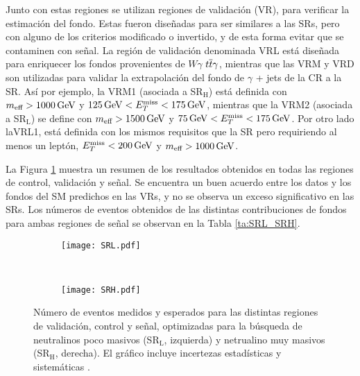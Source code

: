 Junto con estas regiones se utilizan regiones de validación (VR), para verificar la estimación del fondo. Estas fueron diseñadas para ser similares a las SRs, pero con alguno de los criterios modificado o invertido, y de esta forma evitar que se contaminen con señal. La región de validación denominada VRL está diseñada para enriquecer los fondos provenientes de $W\gamma$ $t \overline{t}\gamma$, mientras que las VRM y VRD son utilizadas para validar la extrapolación del fondo de $\gamma$ + jets de la CR a la SR. Así por ejemplo, la VRM1 (asociada a SR$_{\text{H}}$) está definida con $m_{\text{eff}}>1000\, \mathrm{GeV}$ y $125\, \mathrm{GeV}<E_{T}^{\text{miss}}<175\, \mathrm{GeV}$, mientras que la VRM2 (asociada a SR$_{\text{L}}$) se define con $m_{\text{eff}}>1500\, \mathrm{GeV}$ y $75\, \mathrm{GeV}<E_{T}^{\text{miss}}<175\, \mathrm{GeV}$. Por otro lado laVRL1, está definida con los mismos requisitos que la SR pero requiriendo al menos un leptón, $E_{T}^{\text{miss}}<200\, \mathrm{GeV}$ y $m_{\text{eff}}>1000\, \mathrm{GeV}$.






La Figura \ref{SRL_SRH} muestra un resumen de los resultados obtenidos en todas las regiones de control, validación y señal. Se encuentra un buen acuerdo entre los datos y los fondos del SM predichos en las VRs, y no se observa un exceso significativo en las SRs. Los números de eventos obtenidos de las distintas contribuciones de fondos para ambas regiones de señal se observan en la Tabla \ref{ta:SRL_SRH}. 

\begin{figure}

	\begin{subfigure}{0.5\textwidth}
		\texttt{[image: SRL.pdf]} 
	\end{subfigure}
	~
	\begin{subfigure}{0.5\textwidth}
		\texttt{[image: SRH.pdf]}
	\end{subfigure}

	\caption{Número de eventos medidos y esperados para las distintas regiones de validación, control y señal, optimizadas para la búsqueda de neutralinos poco masivos (SR$_{\text{L}}$, izquierda) y netrualino muy masivos (SR$_{\text{H}}$, derecha). El gráfico incluye incertezas estadísticas y sistemáticas \cite{ATLAS:2016fks}.}
\label{SRL_SRH}
\end{figure}


